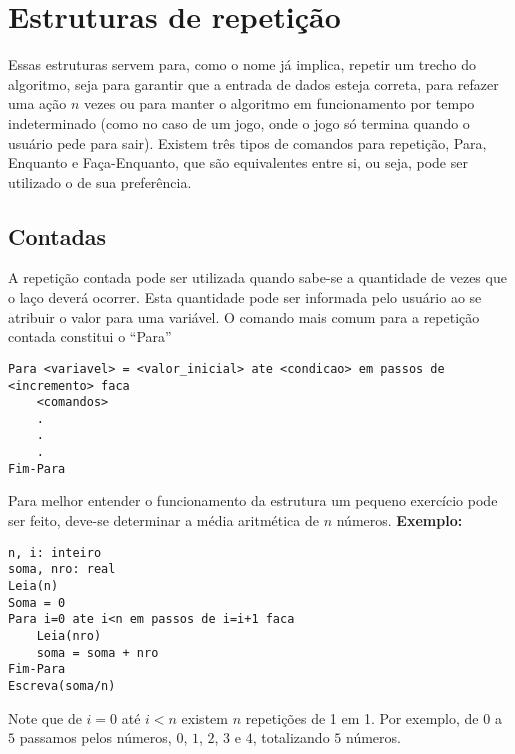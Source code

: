 \chapter{Estruturas de repetição}
Essas estruturas servem para, como o nome já implica, repetir um trecho do algoritmo, seja para garantir que a entrada de dados esteja correta, para refazer uma ação $n$ vezes ou para manter o algoritmo em funcionamento por tempo indeterminado (como no caso de um jogo, onde o jogo só termina quando o usuário pede para sair). Existem três tipos de comandos para repetição, Para, Enquanto e Faça-Enquanto, que são equivalentes entre si, ou seja, pode ser utilizado o de sua preferência.
\section{Contadas}
A repetição contada pode ser utilizada quando sabe-se a quantidade de vezes que o laço deverá ocorrer. Esta quantidade pode ser informada pelo usuário ao se atribuir o valor para uma variável. O comando mais comum para a repetição contada constitui o ``Para''\\
\begin{lstlisting}
Para <variavel> = <valor_inicial> ate <condicao> em passos de <incremento> faca
    <comandos>
    .
    .
    .
Fim-Para
\end{lstlisting}
Para melhor entender o funcionamento da estrutura um pequeno exercício pode ser feito, deve-se determinar a média aritmética de $n$ números. \textbf{Exemplo:}
\pagebreak
\begin{lstlisting}
n, i: inteiro
soma, nro: real
Leia(n)
Soma = 0
Para i=0 ate i<n em passos de i=i+1 faca
    Leia(nro)
    soma = soma + nro
Fim-Para
Escreva(soma/n)
\end{lstlisting}
Note que de $i = 0$ até $i < n$ existem $n$ repetições de 1 em 1. Por exemplo, de $0$ a $5$ passamos pelos números, $0$, $1$, $2$, $3$ e $4$, totalizando $5$ números.
